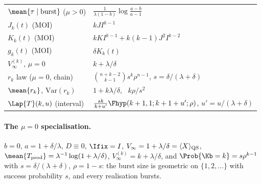 \begin{center}
\begin{tabular}{@{}p{}p{}@{}}
$\mean{\tau\mid\text{burst}}$ ($\mu>0$) & $\frac{1}{\lambda(1-b)}\log\frac{a-b}{a-1}$ \\
$J_k(t)$ (MOI) & $kJ I^{k-1}$ \\
$K_k(t)$ (MOI) & $kK I^{k-1}+k(k-1)J^2I^{k-2}$ \\
$g_k(t)$ (MOI) & $\delta K_k(t)$ \\
$V_\infty^{(k)}$, $\mu=0$ & $k+\lambda/\delta$ \\
$r_k$ law ($\mu=0$, chain) & $\binom{n+k-2}{k-1}s^k\rho^{n-1}$, $s=\delta/(\lambda+\delta)$ \\
$\mean{r_k}$, $\mathrm{Var}(r_k)$ & $1+k\lambda/\delta$, \ $k\rho/s^2$ \\
$\Lap{T}(k,u)$ (interval) & $\frac{sk}{k+u'}\Fhyp(k+1,1;k+1+u';\rho)$, $u'=u/(\lambda+\delta)$ \\
\bottomrule
\end{tabular}
\end{center}

\paragraph{The $\mu=0$ specialisation.} $b=0$, $a=1+\delta/\lambda$,
$D\equiv0$, $\Ifix=I$,
$V_\infty=1+\lambda/\delta=\langle X\rangle_{\rm QS}$,
$\mean{T_{\rm prod}}=\lambda^{-1}\log(1+\lambda/\delta)$,
$V_\infty^{(k)}=k+\lambda/\delta$, and
$\Prob{\Kb=k}=s\rho^{k-1}$ with $s=\delta/(\lambda+\delta)$, $\rho=1-s$:
the burst size is geometric on $\{1,2,\ldots\}$ with success probability
$s$, and every realisation bursts.
